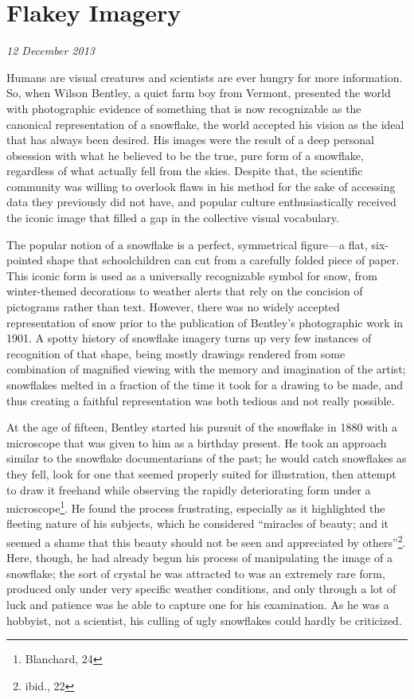 \section{Flakey Imagery}

\textit{12 December 2013}

Humans are visual creatures and scientists are ever hungry for more information.
So, when Wilson Bentley, a quiet farm boy from Vermont, presented the world with
photographic evidence of something that is now recognizable as the canonical
representation of a snowflake, the world accepted his vision as the ideal that
has always been desired. His images were the result of a deep personal obsession
with what he believed to be the true, pure form of a snowflake, regardless of
what actually fell from the skies. Despite that, the scientific community was
willing to overlook flaws in his method for the sake of accessing data they
previously did not have, and popular culture enthusiastically received the
iconic image that filled a gap in the collective visual vocabulary.

The popular notion of a snowflake is a perfect, symmetrical figure---a flat,
six-pointed shape that schoolchildren can cut from a carefully folded piece of
paper. This iconic form is used as a universally recognizable symbol for snow,
from winter-themed decorations to weather alerts that rely on the concision of
pictograms rather than text. However, there was no widely accepted
representation of snow prior to the publication of Bentley's photographic work
in 1901. A spotty history of snowflake imagery turns up very few instances of
recognition of that shape, being mostly drawings rendered from some combination
of magnified viewing with the memory and imagination of the artist; snowflakes
melted in a fraction of the time it took for a drawing to be made, and thus
creating a faithful representation was both tedious and not really possible.

At the age of fifteen, Bentley started his pursuit of the snowflake in 1880 with
a microscope that was given to him as a birthday present. He took an approach
similar to the snowflake documentarians of the past; he would catch snowflakes
as they fell, look for one that seemed properly suited for illustration, then
attempt to draw it freehand while observing the rapidly deteriorating form under
a microscope\footnote{Blanchard, 24}. He found the process frustrating,
especially as it highlighted the fleeting nature of his subjects, which he
considered ``miracles of beauty; and it seemed a shame that this beauty should
not be seen and appreciated by others''\footnote{ibid., 22}. Here, though, he
had already begun his process of manipulating the image of a snowflake; the sort
of crystal he was attracted to was an extremely rare form, produced only under
very specific weather conditions, and only through a lot of luck and patience
was he able to capture one for his examination. As he was a hobbyist, not a
scientist, his culling of ugly snowflakes could hardly be criticized.

